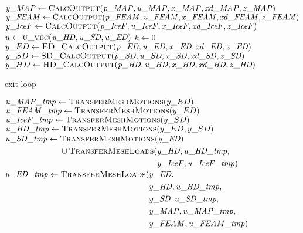\documentclass[10pt,letterpaper,oneside,notitlepage]{article}
\begin{document}
\begin{algorithmic}[1]

	\State
	\State $\mathit{y\_MAP}  \gets \Call{CalcOutput}{\mathit{p\_MAP},\mathit{u\_MAP},\mathit{x\_MAP},\mathit{xd\_MAP},\mathit{z\_MAP}}$ 
	\State $\mathit{y\_FEAM} \gets \Call{CalcOutput}{\mathit{p\_FEAM},\mathit{u\_FEAM},\mathit{x\_FEAM},\mathit{xd\_FEAM},\mathit{z\_FEAM}}$
	\State $\mathit{y\_IceF} \gets \Call{CalcOutput}{\mathit{p\_IceF},\mathit{u\_IceF},\mathit{x\_IceF},\mathit{xd\_IceF},\mathit{z\_IceF}}$
	\State
	\State{}
	\State
	\State $u \gets \Call{u\_vec}{\mathit{u\_HD},\mathit{u\_SD},\mathit{u\_ED}}$
	\State $k \gets 0$
	\Loop{}
		\State $y\_ED \gets \Call{ED\_CalcOutput}{\mathit{p\_ED},\mathit{u\_ED},\mathit{x\_ED},\mathit{xd\_ED},\mathit{z\_ED}}$
		\State $y\_SD \gets \Call{SD\_CalcOutput}{\mathit{p\_SD},\mathit{u\_SD},\mathit{x\_SD},\mathit{xd\_SD},\mathit{z\_SD}}$
		\State $y\_HD \gets \Call{HD\_CalcOutput}{\mathit{p\_HD},\mathit{u\_HD},\mathit{x\_HD},\mathit{xd\_HD},\mathit{z\_HD}}$
	
			\State exit loop
		\EndIf
		
		\State$\mathit{u\_MAP\_tmp} \gets \Call{TransferMeshMotions}{y\_ED}$
		\State$\mathit{u\_FEAM\_tmp} \gets \Call{TransferMeshMotions}{y\_ED}$
		\State$\mathit{u\_IceF\_tmp} \gets \Call{TransferMeshMotions}{y\_SD}$
		\State$\mathit{u\_HD\_tmp} \gets \Call{TransferMeshMotions}{y\_ED,y\_SD}$
		\State$\mathit{u\_SD\_tmp} \gets \!
				\begin{aligned}[t]
           & \Call{TransferMeshMotions}{\mathit{y\_ED}}  \\
					 & \cup \Call{TransferMeshLoads}{}(\!
					    \begin{aligned}[t] 
							   & \mathit{y\_HD},\mathit{u\_HD\_tmp}, \\
					       & \mathit{y\_IceF},\mathit{u\_IceF\_tmp}) \\
							\end{aligned}
			\end{aligned}$
		\State$\mathit{u\_ED\_tmp} \gets \Call{TransferMeshLoads}{}( \!
				     \begin{aligned}[t]   & \mathit{y\_ED,} \\
																  & \mathit{y\_HD},  \mathit{u\_HD\_tmp},  \\
																  & \mathit{y\_SD},  \mathit{u\_SD\_tmp},  \\  
																	& \mathit{y\_MAP}, \mathit{u\_MAP\_tmp}, \\ 
																	& \mathit{y\_FEAM},\mathit{u\_FEAM\_tmp} )
							\end{aligned}$


\end{algorithmic}
\end{document}
